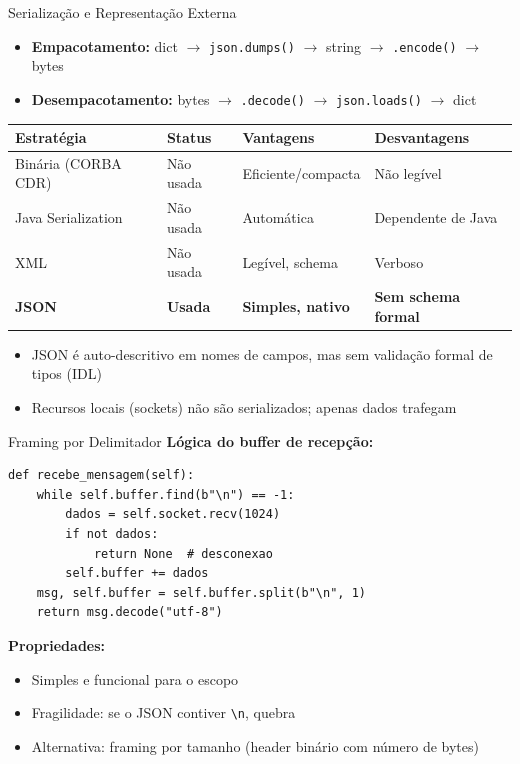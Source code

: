 \documentclass[aspectratio=169]{beamer}
\begin{document}
\begin{frame}{Serializa\c{c}\~ao e Representa\c{c}\~ao Externa}
  \begin{itemize}
    \item \textbf{Empacotamento:} dict $\rightarrow$ \texttt{json.dumps()} $\rightarrow$ string $\rightarrow$ \texttt{.encode()} $\rightarrow$ bytes
    \item \textbf{Desempacotamento:} bytes $\rightarrow$ \texttt{.decode()} $\rightarrow$ \texttt{json.loads()} $\rightarrow$ dict
  \end{itemize}
  \vfill
  \footnotesize
  \begin{tabular}{>{\raggedright\arraybackslash}p{3cm}>{\raggedright\arraybackslash}p{2cm}>{\raggedright\arraybackslash}p{3cm}>{\raggedright\arraybackslash}p{3cm}}
    \toprule
    \textbf{Estrat\'egia} & \textbf{Status} & \textbf{Vantagens} & \textbf{Desvantagens} \\
    \midrule
    Bin\'aria (CORBA CDR) & N\~ao usada & Eficiente/compacta & N\~ao leg\'ivel \\
    Java Serialization & N\~ao usada & Autom\'atica & Dependente de Java \\
    XML & N\~ao usada & Leg\'ivel, schema & Verboso \\
    \textbf{JSON} & \textbf{Usada} & \textbf{Simples, nativo} & \textbf{Sem schema formal} \\
    \bottomrule
  \end{tabular}
  \vfill
  \begin{itemize}
    \item JSON \'e auto-descritivo em nomes de campos, mas sem valida\c{c}\~ao formal de tipos (IDL)
    \item Recursos locais (sockets) n\~ao s\~ao serializados; apenas dados trafegam
  \end{itemize}
\end{frame}

\begin{frame}[fragile]{Framing por Delimitador}
  \textbf{L\'ogica do buffer de recep\c{c}\~ao:}
\begin{lstlisting}[style=pycode, basicstyle=\ttfamily\footnotesize]
def recebe_mensagem(self):
    while self.buffer.find(b"\n") == -1:
        dados = self.socket.recv(1024)
        if not dados:
            return None  # desconexao
        self.buffer += dados
    msg, self.buffer = self.buffer.split(b"\n", 1)
    return msg.decode("utf-8")
\end{lstlisting}
  \vfill
  \textbf{Propriedades:}
  \begin{itemize}
    \item Simples e funcional para o escopo
    \item Fragilidade: se o JSON contiver \texttt{\textbackslash n}, quebra
    \item Alternativa: framing por tamanho (header bin\'ario com n\'umero de bytes)
  \end{itemize}
\end{frame}
\end{document}
